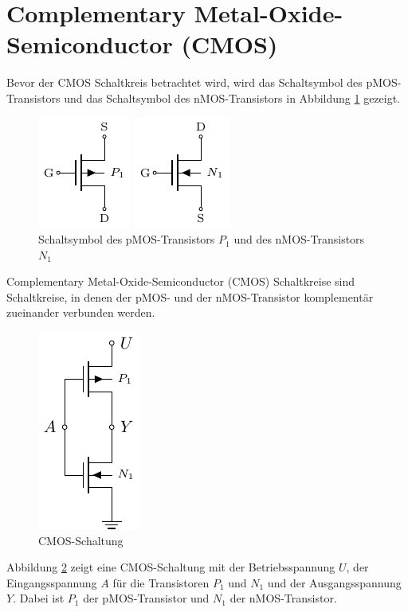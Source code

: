 \documentclass[oneside]{scrarticle}
\numberwithin{equation}{section}
\begin{document}
\section{Complementary Metal-Oxide-Semiconductor (CMOS)}
Bevor der CMOS Schaltkreis betrachtet wird, wird das Schaltsymbol des pMOS-Transistors und das Schaltsymbol des nMOS-Transistors in Abbildung \ref{fig:pmos-nmos} gezeigt.
\begin{figure}[ht]
	\centering
	\begin{minipage}[t]{0.45\textwidth}
		\centering
		\includegraphics[scale=2.2]{tkiz/pmos.pdf}
	\end{minipage}
	\hfill
	\begin{minipage}[t]{0.45\textwidth}
		\centering
		\includegraphics[scale=2.2]{tkiz/nmos.pdf}
	\end{minipage}
	\caption{Schaltsymbol des pMOS-Transistors $P_1$ und des nMOS-Transistors $N_1$}
	\label{fig:pmos-nmos}
\end{figure}

Complementary Metal-Oxide-Semiconductor (CMOS) Schaltkreise sind Schaltkreise, in denen der pMOS- und der nMOS-Transistor komplementär zueinander verbunden werden.
\begin{figure}[h]
	\centering
	\label{fig:cmos-not}
	\includegraphics[scale=2.0]{tkiz/cmos-not.pdf}
	\caption{CMOS-Schaltung}
\end{figure}
Abbildung \ref*{fig:cmos-not} zeigt eine CMOS-Schaltung mit der Betriebsspannung $U$, der Eingangsspannung $A$ für die Transistoren $P_1$ und $N_1$ und der Ausgangsspannung $Y$. Dabei ist $P_1$ der pMOS-Transistor und $N_1$ der nMOS-Transistor.
\end{document}
